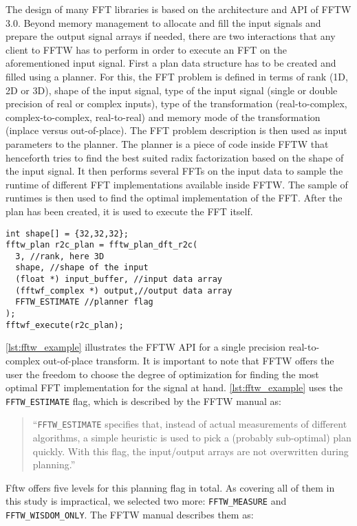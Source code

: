 \label{ssec:modern_ffts}
The design of many FFT libraries is based on the architecture and API of FFTW $3.0$. Beyond memory management to allocate and fill the input signals and prepare the output signal arrays if needed, there are two interactions that any client to FFTW has to perform in order to execute an FFT on the aforementioned input signal. First a plan data structure has to be created and filled using a planner. For this, the FFT problem is defined in terms of rank (1D, 2D or 3D), shape of the input signal, type of the input signal (single or double precision of real or complex inputs), type of the transformation (real-to-complex, complex-to-complex, real-to-real) and memory mode of the transformation (inplace versus out-of-place). The FFT problem description is then used as input parameters to the planner. The planner is a piece of code inside FFTW that henceforth tries to find the best suited radix factorization based on the shape of the input signal. It then performs several FFTs on the input data to sample the runtime of different FFT implementations available inside FFTW. The sample of runtimes is then used to find the optimal implementation of the FFT. After the plan has been created, it is used to execute the FFT itself.
\begin{lstlisting}[caption={Minimal usage example of the FFTW single precision real-to-complex planner API. Memory management is omitted.},label={lst:fftw_example}]
int shape[] = {32,32,32};
fftw_plan r2c_plan = fftw_plan_dft_r2c(
  3, //rank, here 3D
  shape, //shape of the input
  (float *) input_buffer, //input data array
  (fftwf_complex *) output,//output data array
  FFTW_ESTIMATE //planner flag
);
fftwf_execute(r2c_plan);
\end{lstlisting}
\cref{lst:fftw_example} illustrates the FFTW API for a single precision real-to-complex out-of-place transform. It is important to note that FFTW offers the user the freedom to choose the degree of optimization for finding the most optimal FFT implementation for the signal at hand. \cref{lst:fftw_example} uses the \texttt{FFTW\_ESTIMATE} flag, which is described by the FFTW manual \cite{fftw_manual} as:
%
\begin{quote}
``\texttt{FFTW\_ESTIMATE} specifies that, instead of actual measurements of different algorithms, a simple heuristic is used to pick a (probably sub-optimal) plan quickly. With this flag, the input/output arrays are not overwritten during planning.''
\end{quote}
%
Fftw offers five levels for this planning flag in total. As covering all of them in this study is impractical, we selected two more: \texttt{FFTW\_MEASURE} and \texttt{FFTW\_WISDOM\_ONLY}. The FFTW manual describes them as:
